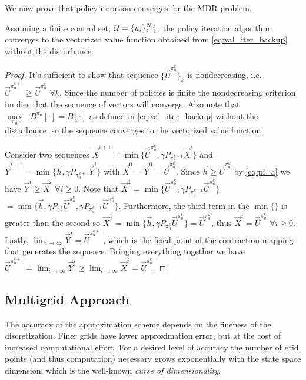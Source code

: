 We now prove that policy iteration converges for the MDR problem.
%
\begin{proposition}
Assuming a finite control set, $\mathcal{U}=\{u_i\}_{i=1}^{N_U}$, the policy iteration algorithm converges to the vectorized value function obtained from \eqref{eq:val_iter_backup} without the disturbance.
\end{proposition}%
\noindent \begin{proof}
It's sufficient to show that sequence ${\{ \vec{U}^{\pi_u^{k}}\}}_k$ is nondecreasing, i.e. $\vec{U}^{\pi_u^{k+1}} \geq \vec{U}^{\pi_u^k}$ $\forall k$. Since the number of policies is finite the nondecreasing criterion implies that the sequence of vectors will converge. Also note that $\underset{\pi_u}{\max}\text{ }B^{\pi_u}[\cdot] = B[\cdot]$ as defined in \eqref{eq:val_iter_backup} without the disturbance, so the sequence converges to the vectorized value function.

Consider two sequences ${\vec{X}^{i+1}=\min\big\{\vec{U}^{\pi_u^k}, \gamma P_{\pi_u^{k+1}}\vec{X}^i \big\}}$ and ${\vec{Y}^{i+1}=\min\big\{\vec{h}, \gamma P_{\pi_u^{k+1}} \vec{Y}^i \big\}}$ with ${\vec{X}^0=\vec{Y}^0=\vec{U}^{\pi_u^k}}$. Since ${\vec{h}\geq \vec{U}^{\pi_u^k}}$ by \eqref{eq:pi_a} we have ${\vec{Y}^i \geq \vec{X}^i}$ ${\forall i \geq 0}$. Note that ${\vec{X}^{1}=\min\big\{\vec{U}^{\pi_u^k},\gamma P_{\pi_u^{k+1}}\vec{U}^{\pi_u^k}\big\}}$ ${=\min\big\{\vec{h}, \gamma P_{\pi_u^{k}}\vec{U}^{\pi_u^k},\gamma P_{\pi_u^{k+1}}\vec{U}^{\pi_u^k}\big\}}$. Furthermore, the third term in the $\min\{\}$ is greater than the second so $\vec{X}^{1}=\min\big\{\vec{h}, \gamma P_{\pi_u^{k}}\vec{U}^{\pi_u^k} \big\} =  \vec{U}^{\pi_u^k}$, thus $\vec{X}^{i} =  \vec{U}^{\pi_u^k}$ $\forall i \geq 0$. Lastly, $\lim_{i\rightarrow \infty}\vec{Y}^i= \vec{U}^{\pi_u^{k+1}}$, which is the fixed-point of the contraction mapping that generates the sequence. Bringing everything together we have $\vec{U}^{\pi_u^{k+1}} = \lim_{i\rightarrow \infty}\vec{Y}^i \geq   \lim_{i\rightarrow \infty}\vec{X}^i = \vec{U}^{\pi_u^{k}}.$
\end{proof}



\subsection{Multigrid Approach}

The accuracy of the approximation scheme depends on the fineness of the discretization. Finer grids have lower approximation error, but at the cost of increased computational effort. For a desired level of accuracy the number of grid points (and thus computation) necessary grows exponentially with the state space dimension, which is the well-known \emph{curse of dimensionality}. 

